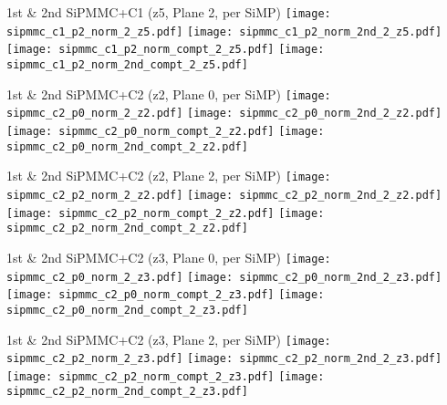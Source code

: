 \documentclass{beamer}
\begin{document}
\begin{frame}{1st \& 2nd SiPMMC+C1 (z5, Plane 2, per SiMP)}
	\texttt{[image: sipmmc\_c1\_p2\_norm\_2\_z5.pdf]}
	\texttt{[image: sipmmc\_c1\_p2\_norm\_2nd\_2\_z5.pdf]} \\
	
		\texttt{[image: sipmmc\_c1\_p2\_norm\_compt\_2\_z5.pdf]}
		\texttt{[image: sipmmc\_c1\_p2\_norm\_2nd\_compt\_2\_z5.pdf]}
\end{frame}

\begin{frame}{1st \& 2nd SiPMMC+C2 (z2, Plane 0, per SiMP)}
	\texttt{[image: sipmmc\_c2\_p0\_norm\_2\_z2.pdf]}
	\texttt{[image: sipmmc\_c2\_p0\_norm\_2nd\_2\_z2.pdf]} \\
	
		\texttt{[image: sipmmc\_c2\_p0\_norm\_compt\_2\_z2.pdf]}
		\texttt{[image: sipmmc\_c2\_p0\_norm\_2nd\_compt\_2\_z2.pdf]}
\end{frame}

\begin{frame}{1st \& 2nd SiPMMC+C2 (z2, Plane 2, per SiMP)}
	\texttt{[image: sipmmc\_c2\_p2\_norm\_2\_z2.pdf]}
	\texttt{[image: sipmmc\_c2\_p2\_norm\_2nd\_2\_z2.pdf]} \\
	
		\texttt{[image: sipmmc\_c2\_p2\_norm\_compt\_2\_z2.pdf]}
		\texttt{[image: sipmmc\_c2\_p2\_norm\_2nd\_compt\_2\_z2.pdf]}
\end{frame}

\begin{frame}{1st \& 2nd SiPMMC+C2 (z3, Plane 0, per SiMP)}
	\texttt{[image: sipmmc\_c2\_p0\_norm\_2\_z3.pdf]}
	\texttt{[image: sipmmc\_c2\_p0\_norm\_2nd\_2\_z3.pdf]} \\
	
		\texttt{[image: sipmmc\_c2\_p0\_norm\_compt\_2\_z3.pdf]}
		\texttt{[image: sipmmc\_c2\_p0\_norm\_2nd\_compt\_2\_z3.pdf]}
\end{frame}

\begin{frame}{1st \& 2nd SiPMMC+C2 (z3, Plane 2, per SiMP)}
	\texttt{[image: sipmmc\_c2\_p2\_norm\_2\_z3.pdf]}
	\texttt{[image: sipmmc\_c2\_p2\_norm\_2nd\_2\_z3.pdf]} \\
	
		\texttt{[image: sipmmc\_c2\_p2\_norm\_compt\_2\_z3.pdf]}
		\texttt{[image: sipmmc\_c2\_p2\_norm\_2nd\_compt\_2\_z3.pdf]}
\end{frame}
\end{document}
